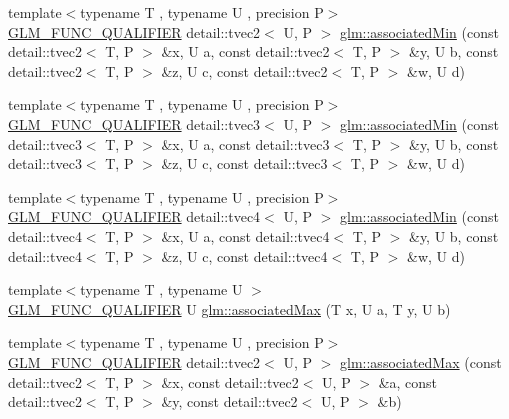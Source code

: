 \begin{DoxyCompactItemize}
\item 
{\footnotesize template$<$typename T , typename U , precision P$>$ }\\\hyperlink{setup_8hpp_a33fdea6f91c5f834105f7415e2a64407}{G\+L\+M\+\_\+\+F\+U\+N\+C\+\_\+\+Q\+U\+A\+L\+I\+F\+I\+ER} detail\+::tvec2$<$ U, P $>$ \hyperlink{namespaceglm_a84819fd961424ab2dbc226ed17025368}{glm\+::associated\+Min} (const detail\+::tvec2$<$ T, P $>$ \&x, U a, const detail\+::tvec2$<$ T, P $>$ \&y, U b, const detail\+::tvec2$<$ T, P $>$ \&z, U c, const detail\+::tvec2$<$ T, P $>$ \&w, U d)
\item 
{\footnotesize template$<$typename T , typename U , precision P$>$ }\\\hyperlink{setup_8hpp_a33fdea6f91c5f834105f7415e2a64407}{G\+L\+M\+\_\+\+F\+U\+N\+C\+\_\+\+Q\+U\+A\+L\+I\+F\+I\+ER} detail\+::tvec3$<$ U, P $>$ \hyperlink{namespaceglm_ab3c49e83b34be39dffcdd3bcffb69d6a}{glm\+::associated\+Min} (const detail\+::tvec3$<$ T, P $>$ \&x, U a, const detail\+::tvec3$<$ T, P $>$ \&y, U b, const detail\+::tvec3$<$ T, P $>$ \&z, U c, const detail\+::tvec3$<$ T, P $>$ \&w, U d)
\item 
{\footnotesize template$<$typename T , typename U , precision P$>$ }\\\hyperlink{setup_8hpp_a33fdea6f91c5f834105f7415e2a64407}{G\+L\+M\+\_\+\+F\+U\+N\+C\+\_\+\+Q\+U\+A\+L\+I\+F\+I\+ER} detail\+::tvec4$<$ U, P $>$ \hyperlink{namespaceglm_a7a99e340d512bb7a18974ee56f22132e}{glm\+::associated\+Min} (const detail\+::tvec4$<$ T, P $>$ \&x, U a, const detail\+::tvec4$<$ T, P $>$ \&y, U b, const detail\+::tvec4$<$ T, P $>$ \&z, U c, const detail\+::tvec4$<$ T, P $>$ \&w, U d)
\item 
{\footnotesize template$<$typename T , typename U $>$ }\\\hyperlink{setup_8hpp_a33fdea6f91c5f834105f7415e2a64407}{G\+L\+M\+\_\+\+F\+U\+N\+C\+\_\+\+Q\+U\+A\+L\+I\+F\+I\+ER} U \hyperlink{namespaceglm_a7700c12d5017a774d6970691147843ba}{glm\+::associated\+Max} (T x, U a, T y, U b)
\item 
{\footnotesize template$<$typename T , typename U , precision P$>$ }\\\hyperlink{setup_8hpp_a33fdea6f91c5f834105f7415e2a64407}{G\+L\+M\+\_\+\+F\+U\+N\+C\+\_\+\+Q\+U\+A\+L\+I\+F\+I\+ER} detail\+::tvec2$<$ U, P $>$ \hyperlink{namespaceglm_a0d88182c5f13f53520322787924d21a6}{glm\+::associated\+Max} (const detail\+::tvec2$<$ T, P $>$ \&x, const detail\+::tvec2$<$ U, P $>$ \&a, const detail\+::tvec2$<$ T, P $>$ \&y, const detail\+::tvec2$<$ U, P $>$ \&b)
\item 

\end{DoxyCompactItemize}
